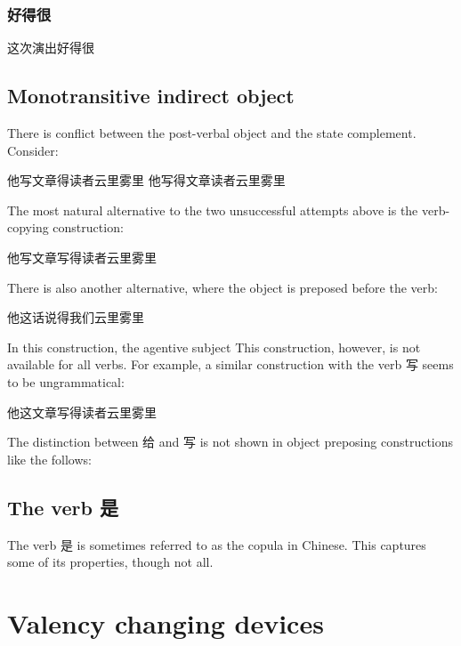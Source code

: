 \documentclass[UTF8, a4paper, oneside, scheme=plain]{ctexart}
\begin{document}
\subsubsection{好得很}


\begin{exe}
    \ex 这次演出好得很
\end{exe}

\subsection{Monotransitive indirect object}

There is conflict between the post-verbal object and the state complement.
Consider:
\begin{exe}
    \ex \begin{xlist}
        \ex *他写文章得读者云里雾里
        \ex *他写得文章读者云里雾里
    \end{xlist}
\end{exe}
The most natural alternative to the two unsuccessful attempts above is the verb-copying construction:
\begin{exe}
    \ex 他写文章写得读者云里雾里
\end{exe}
There is also another alternative,
where the object is preposed before the verb:
\begin{exe}
    \ex 他这话说得我们云里雾里
\end{exe}
In this construction, 
the agentive subject 
This construction, however, is not available for all verbs.
For example, a similar construction with the verb 写 seems to be ungrammatical:
\begin{exe}
    \ex *他这文章写得读者云里雾里
\end{exe}
The distinction between 给 and 写 is not shown 
in object preposing constructions like the follows:

\subsection{The verb 是}

The verb 是 is sometimes referred to as the copula in Chinese.
This captures some of its properties,
though not all. 

\citet[7.8]{zhudexigrammar}

\section{Valency changing devices}\label{sec:valency-changing}
\end{document}
